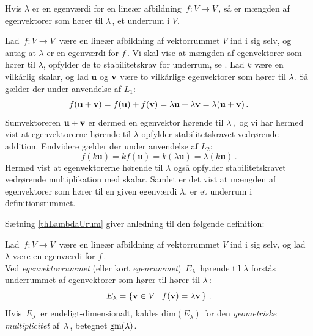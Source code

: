 \begin{theorem}\label{thLambdaUrum}
Hvis $\lambda$ er en egenværdi for en lineær afbildning $\,f:V\rightarrow V\,$, så er mængden af egenvektorer som hører til $\lambda\,$, et underrum i $V$.
\end{theorem}
\begin{bevis}
Lad $\,f:V\rightarrow V\,$ være en lineær afbildning af vektorrummet $V$ ind i sig selv, og antag at $\lambda$ er en egenværdi for $f\,.$ Vi skal vise at mængden af egenvektorer som hører til $\lambda$, opfylder de to stabilitetskrav for underrum, se . Lad $k$ være en vilkårlig skalar, og lad $\mathbf u$ og $\mathbf{v}$ være to vilkårlige egenvektorer som hører til $\lambda$. Så gælder der under anvendelse af $L_1$:
$$
f(\mathbf u+\mathbf{v})=f(\mathbf u)+f(\mathbf{v})=\lambda\mathbf u+    \lambda \mathbf{v}=\lambda(\mathbf u+\mathbf{v})\,.
$$
Sumvektoreren $\mathbf u+\mathbf{v}$ er dermed en egenvektor hørende til $\lambda\,,$ og vi har hermed vist at egenvektorerne hørende til $\lambda$ opfylder stabilitetskravet vedrørende addition. Endvidere gælder der under anvendelse af $L_2$:
$$
f(k\mathbf u) = k f(\mathbf u)= k( \lambda \mathbf u)=\lambda(k\mathbf u)\,.
$$
Hermed vist at egenvektorerne hørende til $\lambda$ også opfylder stabilitetskravet vedrørende multiplikation med skalar. Samlet er det vist at mængden af egenvektorer som hører til en given egenværdi $\lambda$, er et underrum i definitionsrummet.
\end{bevis}

Sætning \ref{thLambdaUrum} giver anledning til den følgende definition:

\begin{definition}[Egenvektorrum]\label{defErum}
Lad $\,f:V \rightarrow V\,$ være en lineær afbildning af vektorrummet $V$ ind i sig selv, og lad $\lambda$ være en egenværdi for $f\,.$ \\

Ved \textit{egenvektorrummet} (eller kort \textit{egenrummet})  $\,E_{\lambda}\,$ hørende til $\lambda$ forstås underrummet af egenvektorer som hører til hører til $\lambda\,$:
$$
E_{\lambda}=\left\{\mathbf{v}\in V\,|\,\,f(\mathbf{v})=\lambda \mathbf{v}\,\right\}\,.$$
Hvis $\,E_{\lambda}\,$ er endeligt-dimensionalt, kaldes dim$(E_{\lambda})$ for den \textit{geometriske multiplicitet} af $\,\lambda\,$, betegnet $ \mathrm{gm}(\lambda) $.
\end{definition}

